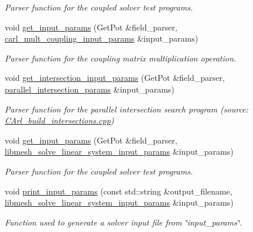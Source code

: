 \begin{DoxyCompactItemize}
\begin{DoxyCompactList}\small\item\em Parser function for the coupled solver test programs. \end{DoxyCompactList}\item 
void \hyperlink{namespacecarl_aebc298614cba13aa318064e3ad08bc10}{get\+\_\+input\+\_\+params} (Get\+Pot \&field\+\_\+parser, \hyperlink{structcarl_1_1carl__mult__coupling__input__params}{carl\+\_\+mult\+\_\+coupling\+\_\+input\+\_\+params} \&input\+\_\+params)
\begin{DoxyCompactList}\small\item\em Parser function for the coupling matrix multiplication operation. \end{DoxyCompactList}\item 
void \hyperlink{namespacecarl_ab80eec3eb20ff6a403ad01bafa649df2}{get\+\_\+intersection\+\_\+input\+\_\+params} (Get\+Pot \&field\+\_\+parser, \hyperlink{structcarl_1_1parallel__intersection__params}{parallel\+\_\+intersection\+\_\+params} \&input\+\_\+params)
\begin{DoxyCompactList}\small\item\em Parser function for the parallel intersection search program (source\+: \hyperlink{_c_arl__build__intersections_8cpp}{C\+Arl\+\_\+build\+\_\+intersections.\+cpp}) \end{DoxyCompactList}\item 
void \hyperlink{namespacecarl_a2b7d0a416cdffe9589a3912c1f4ef20b}{get\+\_\+input\+\_\+params} (Get\+Pot \&field\+\_\+parser, \hyperlink{structcarl_1_1libmesh__solve__linear__system__input__params}{libmesh\+\_\+solve\+\_\+linear\+\_\+system\+\_\+input\+\_\+params} \&input\+\_\+params)
\begin{DoxyCompactList}\small\item\em Parser function for the coupled solver test programs. \end{DoxyCompactList}\item 
void \hyperlink{namespacecarl_ada1b77b2d0f0c7274a9457ba20e16a68}{print\+\_\+input\+\_\+params} (const std\+::string \&output\+\_\+filename, \hyperlink{structcarl_1_1libmesh__solve__linear__system__input__params}{libmesh\+\_\+solve\+\_\+linear\+\_\+system\+\_\+input\+\_\+params} \&input\+\_\+params)
\begin{DoxyCompactList}\small\item\em Function used to generate a solver input file from \char`\"{}input\+\_\+params\char`\"{}. \end{DoxyCompactList}\item 

\end{DoxyCompactItemize}

